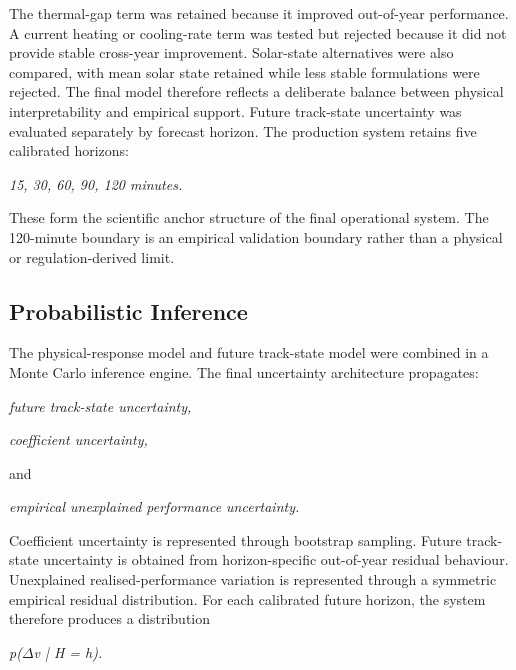 The thermal-gap term was retained because it improved out-of-year performance. A current heating or cooling-rate term was tested but rejected because it did not provide stable cross-year improvement. Solar-state alternatives were also compared, with mean solar state retained while less stable formulations were rejected. The final model therefore reflects a deliberate balance between physical interpretability and empirical support. Future track-state uncertainty was evaluated separately by forecast horizon. The production system retains five calibrated horizons:

\begin{center}\textit{15, 30, 60, 90, 120 minutes.}\end{center}

These form the scientific anchor structure of the final operational system. The 120-minute boundary is an empirical validation boundary rather than a physical or regulation-derived limit.

\subsection{Probabilistic Inference}
The physical-response model and future track-state model were combined in a Monte Carlo inference engine. The final uncertainty architecture propagates:

\begin{center}\textit{future track-state uncertainty,}\end{center}

\begin{center}\textit{coefficient uncertainty,}\end{center}

and

\begin{center}\textit{empirical unexplained performance uncertainty.}\end{center}

Coefficient uncertainty is represented through bootstrap sampling. Future track-state uncertainty is obtained from horizon-specific out-of-year residual behaviour. Unexplained realised-performance variation is represented through a symmetric empirical residual distribution. For each calibrated future horizon, the system therefore produces a distribution

\begin{center}\textit{p(\ensuremath{\Delta}v | H = h).}\end{center}

